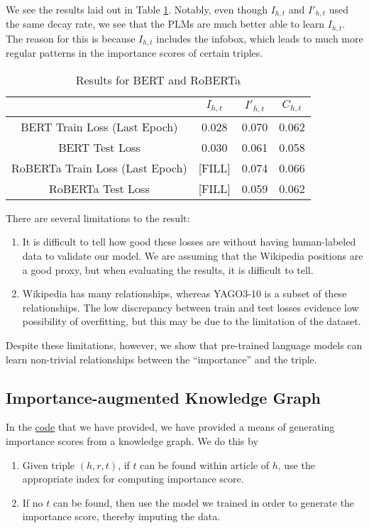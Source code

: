 \documentclass{article}
\begin{document}
We see the results laid out in Table \ref{t1}. Notably, even though $I_{h,t}$ and $I'_{h,t}$ used the same decay rate, we see that the PLMs are much better able to learn $I_{h,t}$. The reason for this is because $I_{h,t}$ includes the infobox, which leads to much more regular patterns in the importance scores of certain triples.

\begin{table}
  \centering
  \begin{tabular}{||c c c c||}
    \hline
      & $I_{h,t}$ & $I'_{h,t}$ & $C_{h,t}$ \\ [0.5ex]
    \hline\hline
    BERT Train Loss (Last Epoch) & 0.028 & 0.070 & 0.062 \\
    \hline
    BERT Test Loss  & 0.030 & 0.061 & 0.058 \\
    \hline
    RoBERTa Train Loss (Last Epoch)  & [FILL] & 0.074 & 0.066 \\
    \hline
    RoBERTa Test Loss  & [FILL] & 0.059 & 0.062 \\
    \hline
  \end{tabular}
  \caption{Results for BERT and RoBERTa}
  \label{t1}
\end{table}

There are several limitations to the result:
\begin{enumerate}
\item It is difficult to tell how good these losses are without having human-labeled data to validate our model. We are assuming that the Wikipedia positions are a good proxy, but when evaluating the results, it is difficult to tell.
\item Wikipedia has many relationships, whereas YAGO3-10 is a subset of these relationships. The low discrepancy between train and test losses evidence low possibility of overfitting, but this may be due to the limitation of the dataset.
\end{enumerate}

Despite these limitations, however, we show that pre-trained language models can learn non-trivial relationships between the ``importance'' and the triple.

\subsection{Importance-augmented Knowledge Graph}
In the \href{https://github.com/joshcho/cs224n-final}{code} that we have provided, we have provided a means of generating importance scores from a knowledge graph. We do this by
\begin{enumerate}
\item Given triple $(h,r,t)$, if $t$ can be found within article of $h$, use the appropriate index for computing importance score.
\item If no $t$ can be found, then use the model we trained in order to generate the importance score, thereby imputing the data.
\end{enumerate}
\end{document}
